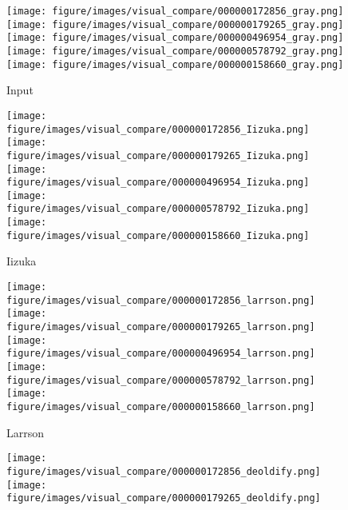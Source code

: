 \begin{figure*}[!t]
    \begin{subfigure}[t]{.16\linewidth}
       \texttt{[image: figure/images/visual\_compare/000000172856\_gray.png]}
      \texttt{[image: figure/images/visual\_compare/000000179265\_gray.png]}
       \texttt{[image: figure/images/visual\_compare/000000496954\_gray.png]}
      \texttt{[image: figure/images/visual\_compare/000000578792\_gray.png]}
       \texttt{[image: figure/images/visual\_compare/000000158660\_gray.png]}
       \caption{Input}
    \end{subfigure}
    \hfill
    \begin{subfigure}[t]{.16\linewidth}
       \texttt{[image: figure/images/visual\_compare/000000172856\_Iizuka.png]}
      \texttt{[image: figure/images/visual\_compare/000000179265\_Iizuka.png]}
       \texttt{[image: figure/images/visual\_compare/000000496954\_Iizuka.png]}
      \texttt{[image: figure/images/visual\_compare/000000578792\_Iizuka.png]}
       \texttt{[image: figure/images/visual\_compare/000000158660\_Iizuka.png]}
       \caption{Iizuka~\etal~\cite{Iizuka-SIGGRAPH-2016}}
    \end{subfigure}
    \hfill
    \begin{subfigure}[t]{.16\linewidth}
       \texttt{[image: figure/images/visual\_compare/000000172856\_larrson.png]}
      \texttt{[image: figure/images/visual\_compare/000000179265\_larrson.png]}
       \texttt{[image: figure/images/visual\_compare/000000496954\_larrson.png]}
      \texttt{[image: figure/images/visual\_compare/000000578792\_larrson.png]}
       \texttt{[image: figure/images/visual\_compare/000000158660\_larrson.png]}
       \caption{Larrson~\etal~\cite{larsson2017colorization}}
    \end{subfigure}
    \hfill
    \begin{subfigure}[t]{.16\linewidth}
       \texttt{[image: figure/images/visual\_compare/000000172856\_deoldify.png]}
      \texttt{[image: figure/images/visual\_compare/000000179265\_deoldify.png]}

\end{subfigure}
\end{figure*}
